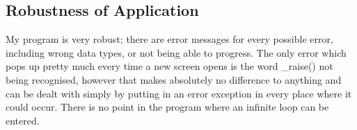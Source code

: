 \subsection{Robustness of Application}

My program is very robust; there are error messages for every possible error, including wrong data types, or not being able to progress. The only error which pops up pretty much every time a new screen opens is the word \_raise() not being recognised, however that makes absolutely no difference to anything and can be dealt with simply by putting in an error exception in every place where it could occur. There is no point in the program where an infinite loop can be entered.